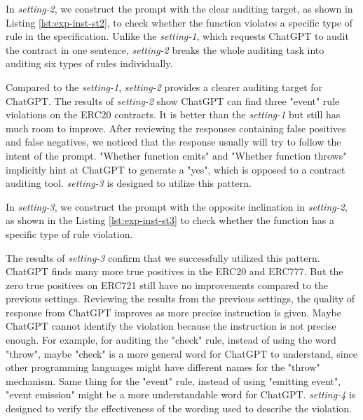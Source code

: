 

In \textit{setting-2}, we construct the prompt with the clear auditing target, as shown in Listing \ref{lst:exp-inst-st2}, to check whether the function violates a specific type of rule in the specification. Unlike the \textit{setting-1}, which requests ChatGPT to audit the contract in one sentence, \textit{setting-2} breaks the whole auditing task into auditing six types of rules individually. 

{  \color{red}
    Compared to the \textit{setting-1}, \textit{setting-2} provides a clearer auditing target for ChatGPT.
    The results of \textit{setting-2} show ChatGPT can find three "event" rule violations on the ERC20 contracts. 
    It is better than the \textit{setting-1} but still has much room to improve. After reviewing the responses containing false positives and false negatives, we noticed that the response usually will try to follow the intent of the prompt. "Whether function emits" and "Whether function throws" implicitly hint at ChatGPT to generate a "yes", which is opposed to a contract auditing tool.
    \textit{setting-3} is designed to utilize this pattern.
}



In \textit{setting-3}, we construct the prompt with the opposite inclination  in \textit{setting-2}, as shown in the Listing \ref{lst:exp-inst-st3} to check whether the function has a specific type of rule violation. 

{  \color{red}
The results of \textit{setting-3} confirm that we successfully utilized this pattern. 
ChatGPT finds many more true positives in the ERC20 and ERC777.
But the zero true positives on ERC721 still have no improvements compared to the previous settings.
Reviewing the results from the previous settings, the quality of response from ChatGPT improves as more precise instruction is given. Maybe ChatGPT cannot identify the violation because the instruction is not precise enough. For example, for auditing the "check" rule, instead of using the word "throw", maybe "check" is a more general word for ChatGPT to understand, since other programming languages might have different names for the "throw" mechanism. Same thing for the "event" rule, instead of using "emitting event", "event emission" might be a more understandable word for ChatGPT. \textit{setting-4} is designed to verify the effectiveness of the wording used to describe the violation.

}

